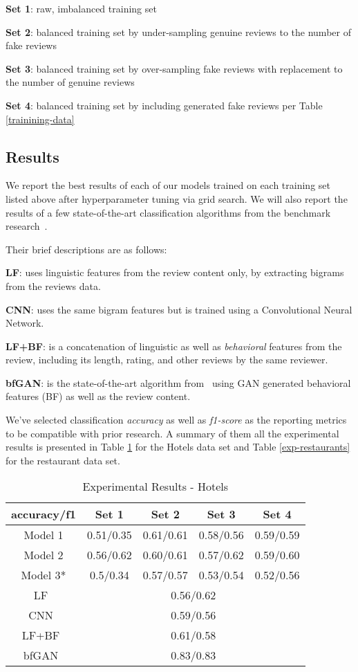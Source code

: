 \documentclass[conference, 11pt]{IEEEtran} %
\theoremstyle{plain}
\theoremstyle{definition}
\begin{document}
 \textbf{Set 1}: raw, imbalanced training set
 
 \textbf{Set 2}: balanced training set by under-sampling genuine reviews to the number of fake reviews
 
 \textbf{Set 3}: balanced training set by over-sampling fake reviews with replacement to the number of genuine reviews
 
 \textbf{Set 4}: balanced training set by including generated fake reviews per Table \ref{trainining-data}

\subsection{Results}
We report the best results of each of our models trained on each training set listed above after hyperparameter tuning via grid search. We will also report the results of a few state-of-the-art classification algorithms from the benchmark research~\cite{Tang2020}.

Their brief descriptions are as follows:

\textbf{LF}: uses linguistic features from the review content only, by extracting bigrams from the reviews data.

\textbf{CNN}: uses the same bigram features but is trained using a Convolutional Neural Network.

\textbf{LF+BF}: is a concatenation of linguistic as well as \textit{behavioral} features from the review, including its length, rating, and other reviews by the same reviewer.

\textbf{bfGAN}: is the state-of-the-art algorithm from~\cite{Tang2020} using GAN generated behavioral features (BF) as well as the review content.

We've selected classification \textit{accuracy} as well as \textit{f1-score} as the reporting metrics to be compatible with prior research. A summary of them all the experimental results is presented in Table \ref{exp-hotels} for the Hotels data set and Table \ref{exp-restaurants} for the restaurant data set.

\begin{table}[H]
\small
\caption{Experimental Results - Hotels}
\centering
\begin{tabular}{|c|c|c|c|c|}
\hline
 accuracy/f1 & Set 1 & Set 2 & Set 3 & Set 4 \\ \hline
 
Model 1 & 0.51/0.35 & 0.61/0.61 & 0.58/0.56 & 0.59/0.59 \\ \hline
Model 2 & 0.56/0.62 & 0.60/0.61 & 0.57/0.62 & 0.59/0.60 \\ \hline
Model 3* & 0.5/0.34 & 0.57/0.57 & 0.53/0.54 & 0.52/0.56 \\ \hline
LF~\cite{Tang2020} & \multicolumn{4}{c|}{0.56/0.62} \\ \hline
CNN~\cite{Tang2020} & \multicolumn{4}{c|}{0.59/0.56} \\ \hline
LF+BF~\cite{Tang2020} & \multicolumn{4}{c|}{0.61/0.58} \\ \hline
bfGAN~\cite{Tang2020} & \multicolumn{4}{c|}{0.83/0.83} \\
\hline
\end{tabular}
\label{exp-hotels}
\end{table}
\end{document}
